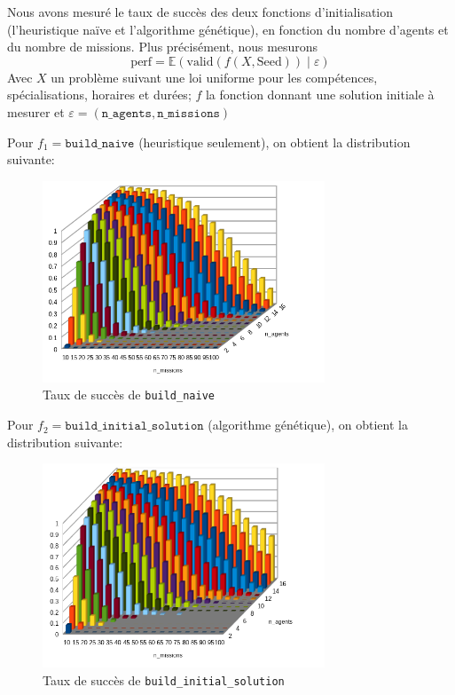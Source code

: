 \documentclass[11pt]{article}
\begin{document}
Nous avons mesuré le taux de succès des deux fonctions d'initialisation (l'heuristique \og naïve \fg et l'algorithme génétique), en fonction du nombre d'agents et du nombre de missions.
Plus précisément, nous mesurons
$$
\text{perf} = \mathbb{E}(\text{valid}(f(X, \text{Seed})) \;\vert\; \varepsilon)
$$
Avec $X$ un problème suivant une loi uniforme pour les compétences, spécialisations, horaires et durées; $f$ la fonction donnant une solution initiale à mesurer et $\varepsilon = (\texttt{n\_agents}, \texttt{n\_missions})$

Pour $f_1 = \texttt{build\_naive}$ (heuristique seulement), on obtient la distribution suivante:

\begin{figure}[H]
    \centering
    \includegraphics[width=0.75\textwidth]{Images/naive.png}
    \caption{Taux de succès de \texttt{build\_naive}}
    \label{fig:naive_success}
\end{figure}

Pour $f_2 = \texttt{build\_initial\_solution}$ (algorithme génétique), on obtient la distribution suivante:

\begin{figure}[H]
    \centering
    \includegraphics[width=0.75\textwidth]{Images/initial.png}
    \caption{Taux de succès de \texttt{build\_initial\_solution}}
    \label{fig:initial_success}
\end{figure}
\end{document}
